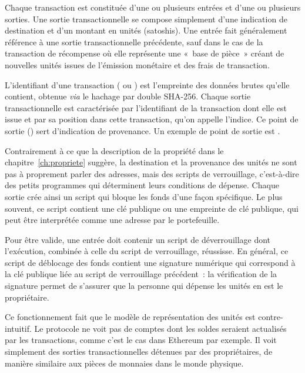 Chaque transaction est constituée d'une ou plusieurs entrées et d'une ou plusieurs sorties. Une sortie transactionnelle se compose simplement d'une indication de destination et d'un montant en unités (satoshis). Une entrée fait généralement référence à une sortie transactionnelle précédente, sauf dans le cas de la transaction de récompense où elle représente une «~base de pièce~» créant de nouvelles unités issues de l'émission monétaire et des frais de transaction. %

L'identifiant d'une transaction ( ou ) est l'empreinte des données brutes qu'elle contient, obtenue \emph{via} le hachage par double SHA-256. Chaque sortie transactionnelle est caractérisée par l'identifiant de la transaction dont elle est issue et par sa position dans cette transaction, qu'on appelle l'indice. Ce point de sortie () sert d'indication de provenance. Un exemple de point de sortie est .

Contrairement à ce que la description de la propriété dans le chapitre~\ref{ch:propriete} suggère, la destination et la provenance des unités ne sont pas à proprement parler des adresses, mais des scripts de verrouillage, c'est-à-dire des petits programmes qui déterminent leurs conditions de dépense. Chaque sortie crée ainsi un script qui bloque les fonds d'une façon spécifique. Le plus souvent, ce script contient une clé publique ou une empreinte de clé publique, qui peut être interprétée comme une adresse par le portefeuille.

Pour être valide, une entrée doit contenir un script de déverrouillage dont l'exécution, combinée à celle du script de verrouillage, réussisse. En général, ce script de déblocage des fonds contient une signature numérique qui correspond à la clé publique liée au script de verrouillage précédent~: la vérification de la signature permet de s'assurer que la personne qui dépense les unités en est le propriétaire.

Ce fonctionnement fait que le modèle de représentation des unités est contre-intuitif. Le protocole ne voit pas de comptes dont les soldes seraient actualisés par les transactions, comme c'est le cas dans Ethereum par exemple. Il voit simplement des sorties transactionnelles détenues par des propriétaires, de manière similaire aux pièces de monnaies dans le monde physique.

